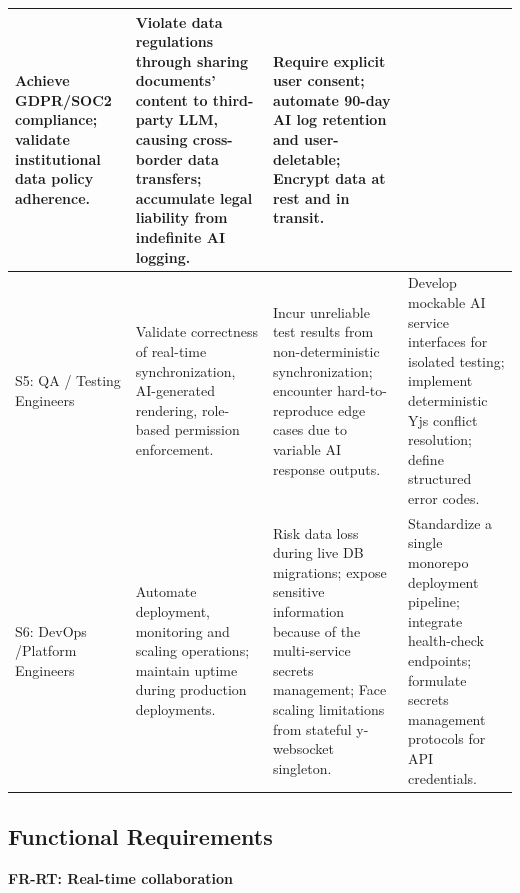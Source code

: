 \documentclass{article}
\begin{document}
\begin{tabularx}{\textwidth}{|>{\hsize=0.5\hsize}X|>{\hsize=1.1\hsize}X|>{\hsize=1.2\hsize}X|>{\hsize=1.2\hsize}X|}
    Achieve GDPR/SOC2 compliance; validate institutional data policy adherence. & 
    Violate data regulations through sharing documents' content to third-party LLM, causing cross-border data transfers; accumulate legal liability from indefinite AI logging.
    & 
    Require explicit user consent; automate 90-day AI log retention and user-deletable; Encrypt data at rest and in transit. \\
    \hline
    S5: QA / Testing Engineers & 
    Validate correctness of real-time synchronization, AI-generated rendering, role-based permission enforcement.& 
    Incur unreliable test results from non-deterministic synchronization; encounter hard-to-reproduce edge cases due to variable AI response outputs.
    & 
    Develop mockable AI service interfaces for isolated testing; implement deterministic Yjs conflict resolution; define structured error codes.\\
    \hline
    S6: DevOps /\newline Platform Engineers & 
    Automate deployment, monitoring and scaling operations; maintain uptime during production deployments.& 
    Risk data loss during live DB migrations; expose sensitive information because of the multi-service secrets management;
    Face scaling limitations from stateful y-websocket singleton.
    & 
    Standardize a single monorepo deployment pipeline; integrate health-check endpoints; formulate secrets management protocols for API credentials. \\
    \hline
\end{tabularx}


\newpage
\subsection{Functional Requirements}
\textbf{FR-RT: Real-time collaboration}
\end{document}

